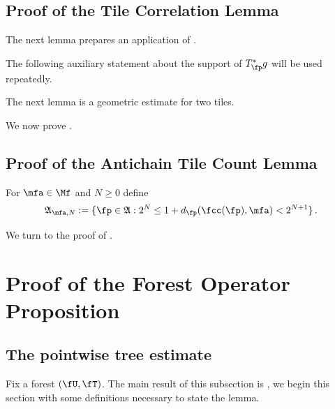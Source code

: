 \subsection{Proof of the Tile Correlation Lemma}\label{sec-tile-operator}

The next lemma prepares an application of
.


The following auxiliary statement about the support of $T_\fp^*g$ will be
used repeatedly.

    


The next lemma is a geometric estimate for two tiles.



We now prove .





\subsection{Proof of the Antichain Tile Count Lemma}
\label{subsec-geolem}





For $\mfa \in \Mf$ and $N\ge 0$ define
\begin{equation}\label{eqantidefap}
    \mathfrak{A}_{\mfa,N}:=\{\fp\in\mathfrak{A}: 2^{N}\le 1+d_{\fp}(\fcc(\fp), \mfa) < 2^{N+1}\} \, .
\end{equation}














We turn to the proof of .



\section{Proof of the Forest Operator Proposition}

\label{treesection}

\subsection{The pointwise tree estimate}
Fix a forest $(\fU, \fT)$. The main result of this subsection is , we begin this section with some definitions necessary to state the lemma.

